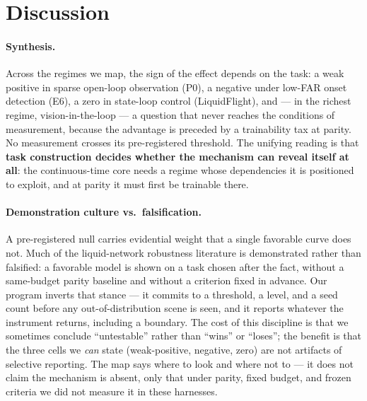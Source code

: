 \documentclass[11pt]{article}
\begin{document}
\section{Discussion}
\paragraph{Synthesis.} Across the regimes we map, the sign of the effect depends on the task: a weak positive in sparse open-loop observation (P0), a negative under low-FAR onset detection (E6), a zero in state-loop control (LiquidFlight), and --- in the richest regime, vision-in-the-loop --- a question that never reaches the conditions of measurement, because the advantage is preceded by a trainability tax at parity. No measurement crosses its pre-registered threshold. The unifying reading is that \textbf{task construction decides whether the mechanism can reveal itself at all}: the continuous-time core needs a regime whose dependencies it is positioned to exploit, and at parity it must first be trainable there.

\paragraph{Demonstration culture vs.\ falsification.} A pre-registered null carries evidential weight that a single favorable curve does not. Much of the liquid-network robustness literature is demonstrated rather than falsified: a favorable model is shown on a task chosen after the fact, without a same-budget parity baseline and without a criterion fixed in advance. Our program inverts that stance --- it commits to a threshold, a level, and a seed count before any out-of-distribution scene is seen, and it reports whatever the instrument returns, including a boundary. The cost of this discipline is that we sometimes conclude ``untestable'' rather than ``wins'' or ``loses''; the benefit is that the three cells we \emph{can} state (weak-positive, negative, zero) are not artifacts of selective reporting. The map says where to look and where not to --- it does not claim the mechanism is absent, only that under parity, fixed budget, and frozen criteria we did not measure it in these harnesses.
\end{document}
